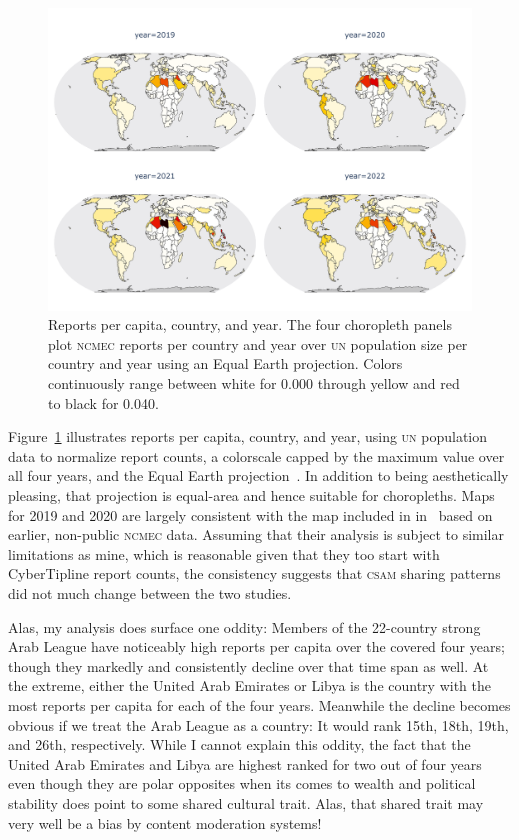 \documentclass[nonacm,screen]{acmart}
\newcommand\V[1]{\textsc{\MakeLowercase{#1}}}
\begin{document}
\begin{figure}
\centering
\includegraphics[scale=0.8]{figure/reports-per-capita}
\caption{Reports per capita, country, and year. The four choropleth panels plot
\V{NCMEC} reports per country and year over \V{UN} population size per country
and year using an Equal Earth projection. Colors continuously range between
white for 0.000 through yellow and red to black for 0.040.}
\label{fig:reports-per-capita}
\end{figure}

Figure~\ref{fig:reports-per-capita} illustrates reports per capita, country, and
year, using \V{UN} population data to normalize report counts, a colorscale
capped by the maximum value over all four years, and the Equal Earth
projection~\cite{SavricPattersonea2019}. In addition to being aesthetically
pleasing, that projection is equal-area and hence suitable for choropleths. Maps
for 2019 and 2020 are largely consistent with the map included in
in~\cite{BurszteinBrightea2019} based on earlier, non-public \V{NCMEC} data.
Assuming that their analysis is subject to similar limitations as mine, which is
reasonable given that they too start with CyberTipline report counts, the
consistency suggests that \V{CSAM} sharing patterns did not much change between
the two studies.

Alas, my analysis does surface one oddity: Members of the 22-country strong Arab
League have noticeably high reports per capita over the covered four years;
though they markedly and consistently decline over that time span as well. At
the extreme, either the United Arab Emirates or Libya is the country with the
most reports per capita for each of the four years. Meanwhile the decline
becomes obvious if we treat the Arab League as a country: It would rank 15th,
18th, 19th, and 26th, respectively. While I cannot explain this oddity, the fact
that the United Arab Emirates and Libya are highest ranked for two out of four
years even though they are polar opposites when its comes to wealth and
political stability does point to some shared cultural trait. Alas, that shared
trait may very well be a bias by content moderation systems!
\end{document}
